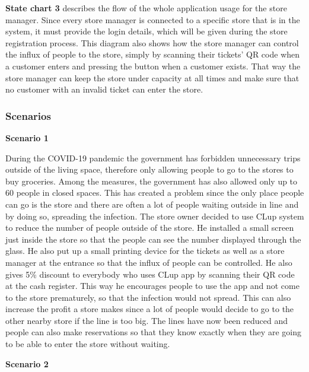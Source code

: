 \hspace{\parindent}\textbf{State chart 3} describes the flow of the whole application usage for the store manager. Since every store manager is connected to a specific store that is in the system, it must provide the login details, which will be given during the store registration process. This diagram also shows how the store manager can control the influx of people to the store, simply by scanning their tickets' QR code when a customer enters and pressing the button when a customer exists. That way the store manager can keep the store under capacity at all times and make sure that no customer with an invalid ticket can enter the store.

\newpage

\subsubsection{Scenarios}

\textbf{Scenario 1}

\hspace{\parindent}During the COVID-19 pandemic the government has forbidden unnecessary trips outside of the living space, therefore only allowing people to go to the stores to buy groceries. Among the measures, the government has also allowed only up to 60 people in closed spaces. This has created a problem since the only place people can go is the store and there are often a lot of people waiting outside in line and by doing so, spreading the infection. The store owner decided to use CLup system to reduce the number of people outside of the store. He installed a small screen just inside the store so that the people can see the number displayed through the glass. He also put up a small printing device for the tickets as well as a store manager at the entrance so that the influx of people can be controlled. He also gives 5\% discount to everybody who uses CLup app by scanning their QR code at the cash register. This way he encourages people to use the app and not come to the store prematurely, so that the infection would not spread. This can also increase the profit a store makes since a lot of people would decide to go to the other nearby store if the line is too big. The lines have now been reduced and people can also make reservations so that they know exactly when they are going to be able to enter the store without waiting. \break

\textbf{Scenario 2}

